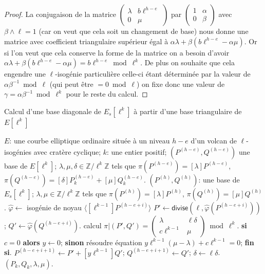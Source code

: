 \documentclass[10pt,a4paper]{book}
\theoremstyle{plain}
\theoremstyle{definition}
\theoremstyle{definition}
\theoremstyle{definition}
\theoremstyle{definition}
\theoremstyle{remark}
\theoremstyle{remark}
\theoremstyle{definition}
\begin{document}
\begin{proof}
La conjugaison de la matrice $\left ( \begin{smallmatrix}\lambda & b\ell^{h-e}\\0 & \mu
\end{smallmatrix}\right )$ par $\left ( \begin{smallmatrix}1 & \alpha \\0 & \beta
\end{smallmatrix}\right )$ avec $\beta \wedge \ell =1$ (car on veut que cela 
soit un changement de base) nous donne une matrice avec coefficient 
triangulaire supérieur égal à $\alpha \lambda + \beta (b \ell^{h-e} - \alpha 
\mu)$. Or si l'on veut que cela conserve la forme de la matrice on a besoin 
d'avoir $\alpha \lambda + \beta (b \ell^{h-e} - \alpha \mu)= b \ell^{h-e} \bmod
\ell^k$. De plus on souhaite que cela engendre une $\ell$-isogénie 
particulière celle-ci étant déterminée par la valeur de $\alpha \beta^{-1} 
\bmod \ell$ (qui peut être $=0 \bmod \ell$) on fixe donc une valeur de $\gamma 
= \alpha \beta^{-1} \bmod \ell^k$ pour le reste du calcul.
\end{proof}

\begin{algorithm}
\caption{\label{alg:rem:tri:old}Calcul d'une base diagonale de $E_s[\ell^k]$ à partir d'une base triangulaire de $E[\ell^k]$}
\begin{algorithmic}[1]
\REQUIRE $E$: une courbe elliptique ordinaire située à un niveau $h-e$ d'un volcan de $\ell$-isogénies avec cratère cyclique;
$k$: une entier positif; $(P^{(h-e)},Q^{(h-e)})$ une base de $E[\ell^k]$; $\lambda, \mu, \delta \in \mathbb{Z}/\ell^k \mathbb{Z}$
tels que $\pi(P^{(h-e)})= [\lambda] P^{(h-e)}$, $ \pi(Q^{(h-e)})=[\delta] P^{(h-e)}_{k} +  [\mu] Q^{(h-e)}_{k}$.
\ENSURE $(P^{(h)}, Q^{(h)} )$: une base de $E_s[\ell^k]$;
$\lambda, \mu \in \mathbb{Z}/\ell^k \mathbb{Z}$
tels que $\pi(P^{(h)})= [\lambda] P^{(h)}$, $ \pi(Q^{(h)})= [\mu] Q^{(h)}$.
\STATE\label{alg:rem:iso}  $\widehat{\varphi} \leftarrow $ isogénie de noyau $\langle [\ell^{k-1}]P^{(h-e+i)} \rangle$
\STATE\label{alg:rem:divide}
  $P' \leftarrow \mathsf{divise}(\ell, \widehat{\varphi}(P^{(h-e+i)}))$; $Q' \leftarrow \widehat{\varphi}(Q^{(h-e+i)})$.
\STATE\label{alg:rem:frobenius}
  calcul $\pi|(P',Q')=\left( \begin{smallmatrix}
\lambda  & \ell \delta \\
c\ell^{k-1} & \mu  \end{smallmatrix} \right) \bmod {\ell^{k}}.$
\STATE 
  \textbf{si} $c=0$ \textbf{alors} $y \leftarrow 0 $; 
\STATE\label{alg:rem:solve1}
  \textbf{sinon} résoudre équation
 $y\ell^{k-1}(\mu - \lambda) + c \ell^{k-1}=0$; \textbf{fin si}.
\STATE
  $P^{(h-e+i+1)} \leftarrow P' + [y \ell^{k-1}] Q'$; $Q^{(h-e+i+1)} \leftarrow Q'$; $\delta \leftarrow \ell \delta$.
\ENDFOR
\RETURN $(P_{k},Q_{k},\lambda,\mu).$
\end{algorithmic}
\end{algorithm}
\end{document}
